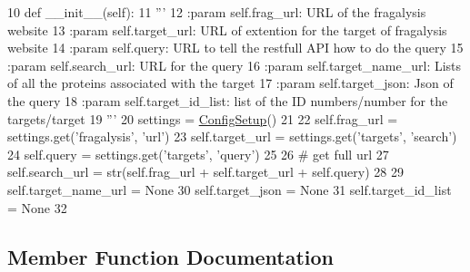 \begin{DoxyCode}
10     \textcolor{keyword}{def }\_\_init\_\_(self):
11         \textcolor{stringliteral}{'''}
12 \textcolor{stringliteral}{        :param self.frag\_url: URL of the fragalysis website}
13 \textcolor{stringliteral}{        :param self.target\_url: URL of extention for the target of fragalysis website}
14 \textcolor{stringliteral}{        :param self.query: URL to tell the restfull API how to do the query}
15 \textcolor{stringliteral}{        :param self.search\_url: URL for the query }
16 \textcolor{stringliteral}{        :param self.target\_name\_url: Lists of all the proteins associated with the target}
17 \textcolor{stringliteral}{        :param self.target\_json: Json of the query}
18 \textcolor{stringliteral}{        :param self.target\_id\_list: list of the ID numbers/number for the targets/target}
19 \textcolor{stringliteral}{        '''}
20         settings = \hyperlink{namespacefragalysis__api_1_1xcglobalscripts_1_1set__config_a9b5445f82604ad45c1e85e2b07e4a317}{ConfigSetup}()
21 
22         self.frag\_url = settings.get(\textcolor{stringliteral}{'fragalysis'}, \textcolor{stringliteral}{'url'})
23         self.target\_url = settings.get(\textcolor{stringliteral}{'targets'}, \textcolor{stringliteral}{'search'})
24         self.query = settings.get(\textcolor{stringliteral}{'targets'}, \textcolor{stringliteral}{'query'})
25 
26         \textcolor{comment}{# get full url}
27         self.search\_url = str(self.frag\_url + self.target\_url + self.query)
28 
29         self.target\_name\_url = \textcolor{keywordtype}{None}
30         self.target\_json = \textcolor{keywordtype}{None}
31         self.target\_id\_list = \textcolor{keywordtype}{None}
32 
\end{DoxyCode}


\subsection{Member Function Documentation}
\mbox{\label{classfragalysis__api_1_1xcextracter_1_1getdata_1_1_get_targets_data_af26e1f97fa431c2bb490985e7af0eb45}} 
